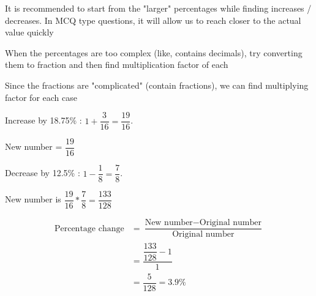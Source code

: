 \begin{NOTE}
    It is recommended to start from the "larger" percentages while finding increases / decreases. In MCQ type questions, it will allow us to reach closer to the actual value quickly
\end{NOTE}

When the percentages are too complex (like, contains decimals), try converting them to fraction and then find multiplication factor of each


Since the fractions are "complicated" (contain fractions), we can find multiplying factor for each case

\begin{multicols}{2}

    Increase by 18.75\% : $1 + \dfrac{3}{16} = \dfrac{19}{16}$. 
    
    New number = $\dfrac{19}{16}$
    
    \columnbreak
    Decrease by 12.5\% : $1 - \dfrac{1}{8} = \dfrac{7}{8}$. 
    
    New number is $\dfrac{19}{16} * \dfrac{7}{8} = \dfrac{133}{128}$
    
\end{multicols}
\vspace{0.2cm}

\begin{align*}
    \text{Percentage change} &= \dfrac{\text{New number} - \text{Original number}}{\text{Original number}} \\
    &= \dfrac{\dfrac{133}{128} - 1}{1} \\
    &= \dfrac{5}{128} = 3.9\% \\
\end{align*}


\newpage


